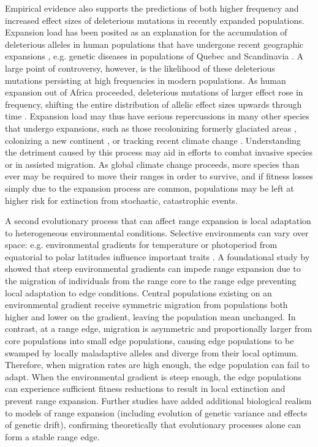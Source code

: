 Empirical evidence also supports the predictions of both higher frequency and increased effect sizes of deleterious mutations in recently expanded populations. Expansion load has been posited as an explanation for the accumulation of deleterious alleles in human populations that have undergone recent geographic expansions \citep{Karlsson:2014}, e.g. genetic diseases in populations of Quebec \citep{Scriver:2001, Yotova:2005, Labuda:1997} and Scandinavia \citep{Norio:2003}%
. A large point of controversy, however, is the likelihood of these deleterious mutations persisting at high frequencies in modern populations. As human expansion out of Africa proceeded, deleterious mutations of larger effect rose in frequency, shifting the entire distribution of allelic effect sizes upwards through time \citep{Henn:2015}. Expansion load may thus have serious repercussions in many other species that undergo expansions, such as those recolonizing formerly glaciated areas \citep{Hewitt:1999}, colonizing a new continent \citep{Sakai:2001}, or tracking recent climate change \citep{Chen:2011}. Understanding the detriment caused by this process may aid in efforts to combat invasive species or in assisted migration. As global climate change proceeds, more species than ever may be required to move their ranges in order to survive, and if fitness losses simply due to the expansion process are common, populations may be left at higher risk for extinction from stochastic, catastrophic events. 

A second evolutionary process that can affect range expansion is local adaptation to heterogeneous environmental conditions. Selective environments can vary over space: e.g. environmental gradients for temperature or photoperiod from equatorial to polar latitudes influence important traits \citep{Conover:1992, Montague:2008}. A foundational study by \citet{Kirkpatrick:1997} showed that steep environmental gradients can impede range expansion due to the migration of individuals from the range core to the range edge preventing local adaptation to edge conditions. Central populations existing on an environmental gradient receive symmetric migration from populations both higher and lower on the gradient, leaving the population mean unchanged. In contrast, at a range edge, migration is asymmetric and proportionally larger from core populations into small edge populations, causing edge populations to be swamped by locally maladaptive alleles and diverge from their local optimum. Therefore, when migration rates are high enough, the edge population can fail to adapt. When the environmental gradient is steep enough, the edge populations can experience sufficient fitness reductions to result in local extinction and prevent range expansion. Further studies \citep{Barton:2001, Polechova:2015} have added additional biological realism to models of range expansion (including evolution of genetic variance and effects of genetic drift), confirming theoretically that evolutionary processes alone can form a stable range edge. 


